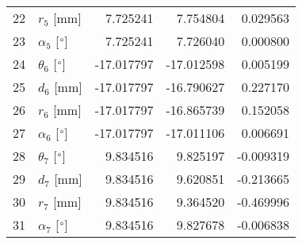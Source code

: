 \documentclass{standalone}%
\begin{document}
\begin{tabular}{llrrr}
22 &              $r_{5}$ [mm] &   7.725241 &   7.754804 &   0.029563 \\
23 &  $\alpha_{5}$ [$\degree$] &   7.725241 &   7.726040 &   0.000800 \\
24 &  $\theta_{6}$ [$\degree$] & -17.017797 & -17.012598 &   0.005199 \\
25 &              $d_{6}$ [mm] & -17.017797 & -16.790627 &   0.227170 \\
26 &              $r_{6}$ [mm] & -17.017797 & -16.865739 &   0.152058 \\
27 &  $\alpha_{6}$ [$\degree$] & -17.017797 & -17.011106 &   0.006691 \\
28 &  $\theta_{7}$ [$\degree$] &   9.834516 &   9.825197 &  -0.009319 \\
29 &              $d_{7}$ [mm] &   9.834516 &   9.620851 &  -0.213665 \\
30 &              $r_{7}$ [mm] &   9.834516 &   9.364520 &  -0.469996 \\
31 &  $\alpha_{7}$ [$\degree$] &   9.834516 &   9.827678 &  -0.006838 \\
\bottomrule
\end{tabular}
%
\end{document}
